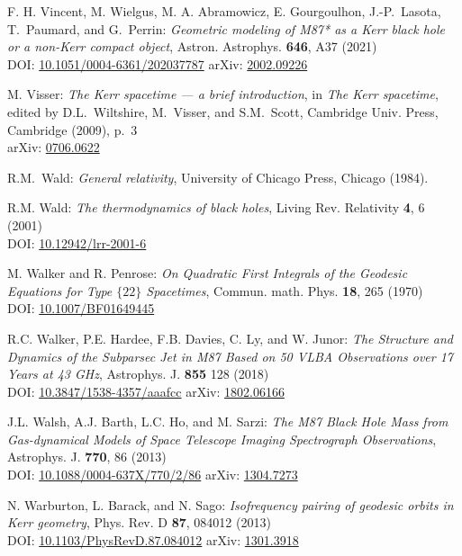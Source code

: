 \begin{thebibliography}{123}
F. H. Vincent, M. Wielgus, M. A. Abramowicz, E. Gourgoulhon, J.-P.~Lasota, T.~Paumard,
and G.~Perrin:
{\em Geometric modeling of M87* as a Kerr black hole or a non-Kerr compact object},
Astron. Astrophys. {\bf 646}, A37 (2021)\\
DOI: \href{https://doi.org/10.1051/0004-6361/202037787}{10.1051/0004-6361/202037787}\hfill
arXiv: \href{https://arxiv.org/abs/2002.09226}{2002.09226}

M. Visser: {\em The Kerr spacetime --- a brief introduction},
in {\em The Kerr spacetime}, edited by D.L.~Wiltshire, M.~Visser, and S.M.~Scott,
Cambridge Univ. Press, Cambridge (2009), p.~3\\
arXiv: \href{https://arxiv.org/abs/0706.0622}{0706.0622}

R.M.~Wald: {\em General relativity},
University of Chicago Press, Chicago (1984).

R.M. Wald: {\em The thermodynamics of black holes},
Living Rev. Relativity {\bf 4}, 6 (2001) \\
DOI: \href{https://doi.org/10.12942/lrr-2001-6}{10.12942/lrr-2001-6}

M. Walker and R. Penrose: {\em On Quadratic First Integrals of the Geodesic Equations
for Type $\{22\}$ Spacetimes},
Commun. math. Phys. {\bf 18}, 265 (1970)\\
DOI: \href{https://doi.org/10.1007/BF01649445}{10.1007/BF01649445}

R.C. Walker, P.E. Hardee, F.B. Davies, C. Ly, and W. Junor:
{\em The Structure and Dynamics of the Subparsec Jet in M87 Based on 50 VLBA Observations over 17 Years at 43 GHz},
Astrophys. J. {\bf 855} 128 (2018)\\
DOI: \href{https://doi.org/10.3847/1538-4357/aaafcc}{10.3847/1538-4357/aaafcc}\hfill
arXiv: \href{https://arxiv.org/abs/1802.06166}{1802.06166}

J.L. Walsh, A.J. Barth, L.C. Ho, and M. Sarzi:
{\em The M87 Black Hole Mass from Gas-dynamical Models of Space Telescope Imaging Spectrograph Observations},
Astrophys. J. {\bf 770}, 86 (2013)\\
DOI: \href{https://doi.org/10.1088/0004-637X/770/2/86}{10.1088/0004-637X/770/2/86}\hfill
arXiv: \href{https://arxiv.org/abs/1304.7273}{1304.7273}

N. Warburton, L. Barack, and N. Sago:
{\em Isofrequency pairing of geodesic orbits in Kerr geometry},
Phys. Rev. D {\bf 87}, 084012 (2013)\\
DOI: \href{https://doi.org/10.1103/PhysRevD.87.084012}{10.1103/PhysRevD.87.084012}\hfill
arXiv: \href{https://arxiv.org/abs/1301.3918}{1301.3918}


\end{thebibliography}

